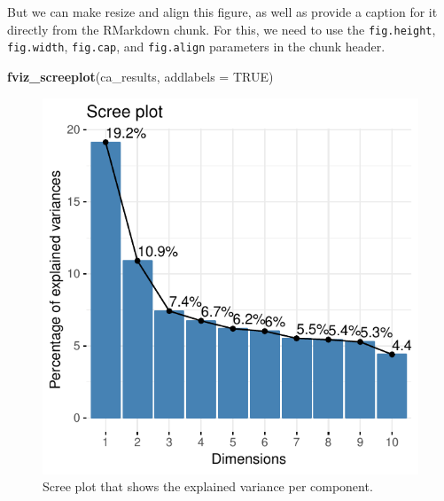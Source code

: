\documentclass[]{article}
\newenvironment{Shaded}{\begin{snugshade}}{\end{snugshade}}
\newcommand{\DataTypeTok}[1]{\textcolor[rgb]{0.13,0.29,0.53}{#1}}
\newcommand{\KeywordTok}[1]{\textcolor[rgb]{0.13,0.29,0.53}{\textbf{#1}}}
\newcommand{\NormalTok}[1]{#1}
\newcommand{\OtherTok}[1]{\textcolor[rgb]{0.56,0.35,0.01}{#1}}
\begin{document}
But we can make resize and align this figure, as well as provide a
caption for it directly from the RMarkdown chunk. For this, we need to
use the \texttt{fig.height}, \texttt{fig.width}, \texttt{fig.cap}, and
\texttt{fig.align} parameters in the chunk header.

\begin{Shaded}
\begin{Highlighting}[]
\KeywordTok{fviz_screeplot}\NormalTok{(ca_results, }\DataTypeTok{addlabels =} \OtherTok{TRUE}\NormalTok{)}
\end{Highlighting}
\end{Shaded}

\begin{figure}

{\centering \includegraphics{1_a_Simple_RMarkdown_PDF_files/figure-latex/visualize_ca_scree_chunk_parameters-1} 

}

\caption{Scree plot that shows the explained variance per component.}\label{fig:visualize_ca_scree_chunk_parameters}
\end{figure}
\end{document}
